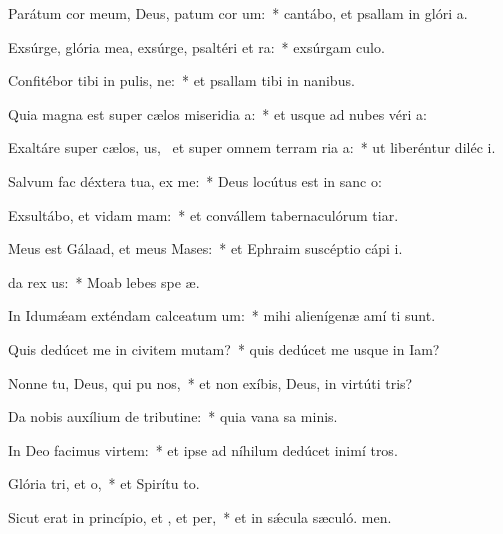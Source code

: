 \item Parátum cor meum, Deus, patum cor um:~* cantábo, et psallam in glóri a.
\item Exsúrge, glória mea, exsúrge, psaltéri et ra:~* exsúrgam culo.
\item Confitébor tibi in pulis, ne:~* et psallam tibi in nanibus.
\item Quia magna est super cælos miseridia a:~* et usque ad nubes véri a:
\item Exaltáre super cælos, us,~\pscross{} et super omnem terram ria a:~* ut liberéntur diléc i.
\item Salvum fac déxtera tua,  ex me:~* Deus locútus est in sanc o:
\item Exsultábo, et vidam mam:~* et convállem tabernaculórum tiar.
\item Meus est Gálaad, et meus  Mases:~* et Ephraim suscéptio cápi i.
\item {}da rex us:~* Moab lebes spe æ.
\item In Idumǽam exténdam calceatum um:~* mihi alienígenæ amí ti sunt.
\item Quis dedúcet me in civitem mutam?~* quis dedúcet me usque in Iam?
\item Nonne tu, Deus, qui pu nos,~* et non exíbis, Deus, in virtúti tris?
\item Da nobis auxílium de tributine:~* quia vana sa minis.
\item In Deo facimus virtem:~* et ipse ad níhilum dedúcet inimí tros.
\item Glória tri, et o,~* et Spirítu to.
\item Sicut erat in princípio, et , et per,~* et in sǽcula sæculó. men.
